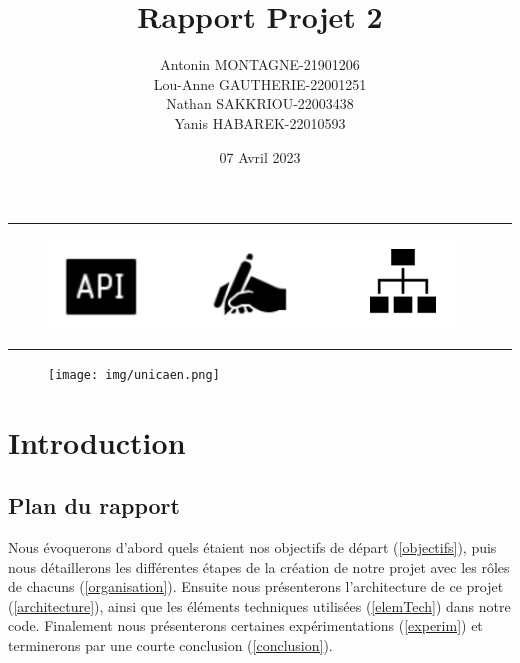 \documentclass[french,12pt]{article}
\title{Rapport Projet 2}
\date{07 Avril 2023}
\begin{document}
\maketitle
\rule{\linewidth}{.5pt}

\begin{figure}[h]
	\begin{center}
		\includegraphics[scale=0.8]{img/fond.png}	
	\end{center}
\end{figure}
\rule{\linewidth}{.5pt}
\begin{center}
\author{Antonin MONTAGNE-21901206\\ Lou-Anne GAUTHERIE-22001251\\ Nathan SAKKRIOU-22003438 \\
    Yanis HABAREK-22010593}
\end{center}

\begin{figure}[b]
	\begin{center}
		\texttt{[image: img/unicaen.png]}	
	\end{center}
\end{figure}

\thispagestyle{empty}
\setcounter{page}{0}
\newpage

\tableofcontents
\newpage

\section{Introduction}

\subsection{Plan du rapport}

Nous évoquerons d'abord quels étaient nos objectifs de départ (\ref{objectifs}), puis nous détaillerons les différentes étapes de la création de notre projet avec les rôles de chacuns (\ref{organisation}). Ensuite nous présenterons l'architecture de ce projet (\ref{architecture}), ainsi que les éléments techniques utilisées (\ref{elemTech}) dans notre code. Finalement nous présenterons certaines expérimentations (\ref{experim}) et terminerons par une courte conclusion (\ref{conclusion}).
\end{document}
